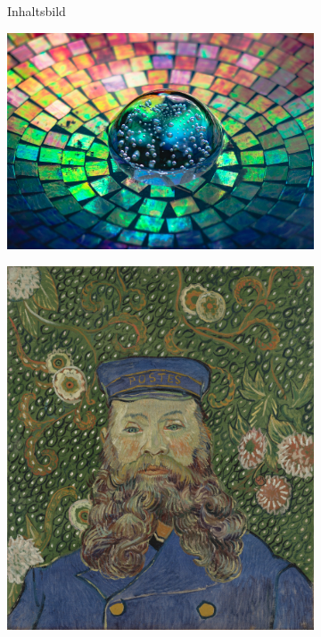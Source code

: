 \begin{figure}[H]
    \centering

    \begin{subfigure}[h]{0.21\textwidth}
        \centering
        Inhaltsbild
    \end{subfigure}
    \begin{subfigure}[h]{0.21\textwidth}
        \centering
        \includegraphics[width=\textwidth]{resources/content/style/crystal_glass_on_a_colorful_background.jpg}
    \end{subfigure}
    \begin{subfigure}[h]{0.21\textwidth}
        \centering
        \includegraphics[width=\textwidth]{resources/content/style/portrait_of_joseph_roulin.jpg}

\end{subfigure}
\end{figure}
